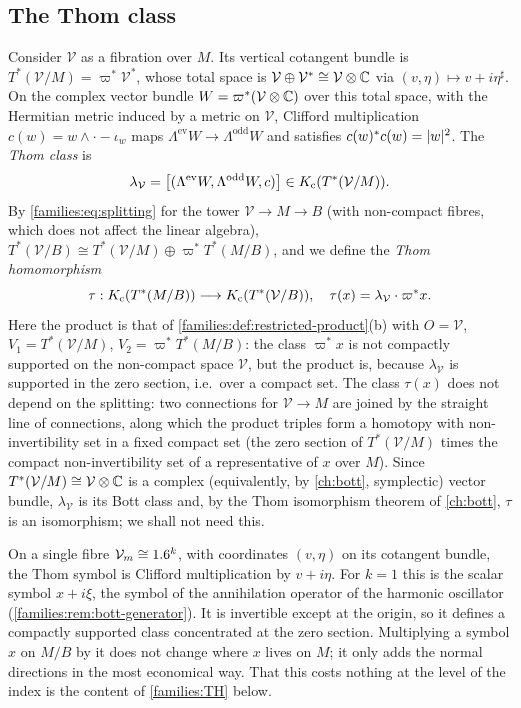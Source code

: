 \subsection{The Thom class}
Consider $\mathcal V$ as a fibration over $M$. Its vertical cotangent bundle
is $T^*(\mathcal V/M)=\varpi^*\mathcal V^*$, whose total space is
$\mathcal V\oplus\mathcal V^*\cong\mathcal V\otimes\mathbb{C}$ via
$(v,\eta)\mapsto v+i\eta^\sharp$. On the complex vector bundle
$W=\varpi^*(\mathcal V\otimes\mathbb{C})$ over this total space, with the Hermitian
metric induced by a metric on $\mathcal V$, Clifford multiplication
$c(w)=w\wedge\cdot-\iota_w$ maps $\Lambda^{\mathrm{ev}}W\to
\Lambda^{\mathrm{odd}}W$ and satisfies $c(w)^*c(w)=\lvert w\rvert^2$. The \emph{Thom
class} is
\begin{equation}\label{families:eq:thom}
  \lambda_{\mathcal V}=\bigl[(\Lambda^{\mathrm{ev}}W,\Lambda^{\mathrm{odd}}W,c)
  \bigr]\in K_{\mathrm{c}}(T^*(\mathcal V/M)).
\end{equation}
By \eqref{families:eq:splitting} for the tower $\mathcal V\to M\to B$ (with
non-compact fibres, which does not affect the linear algebra),
$T^*(\mathcal V/B)\cong T^*(\mathcal V/M)\oplus\varpi^*T^*(M/B)$, and we define
the \emph{Thom homomorphism}
\begin{equation*}
  \tau:K_{\mathrm{c}}(T^*(M/B))\longrightarrow K_{\mathrm{c}}(T^*(\mathcal V/B)),\quad
  \tau(x)=\lambda_{\mathcal V}\cdot\varpi^*x.
\end{equation*}
Here the product is that of \cref{families:def:restricted-product}(b) with
$O=\mathcal V$, $V_1=T^*(\mathcal V/M)$, $V_2=\varpi^*T^*(M/B)$: the class
$\varpi^*x$ is not compactly supported on the non-compact space $\mathcal V$,
but the product is, because $\lambda_{\mathcal V}$ is supported in the zero
section, i.e.\ over a compact set. The class $\tau(x)$ does not depend on the
splitting: two connections for $\mathcal V\to M$ are joined by the straight
line of connections, along which the product triples form a homotopy with
non-invertibility set in a fixed compact set (the zero section of
$T^*(\mathcal V/M)$ times the compact non-invertibility set of a representative of
$x$ over $M$).
Since $T^*(\mathcal V/M)\cong\mathcal V\otimes\mathbb{C}$ is a complex (equivalently, by
\cref{ch:bott}, symplectic) vector bundle, $\lambda_{\mathcal V}$ is its Bott class and, by the
Thom isomorphism theorem of \cref{ch:bott}, $\tau$ is an isomorphism; we shall not need
this.

\begin{discussion}
  On a single fibre $\mathcal V_m\cong1.6^k$, with coordinates $(v,\eta)$ on its
  cotangent bundle, the Thom symbol is Clifford multiplication by $v+i\eta$. For
  $k=1$ this is the scalar symbol $x+i\xi$, the symbol of the annihilation operator
  of the harmonic oscillator (\cref{families:rem:bott-generator}). It is invertible
  except at the origin, so it defines a compactly supported class concentrated
  at the zero section. Multiplying a symbol $x$ on $M/B$ by it does not change
  where $x$ lives on $M$; it only adds the normal directions in the most economical
  way. That this costs nothing at the level of the index is the content of
  \ref{families:TH} below.
\end{discussion}

